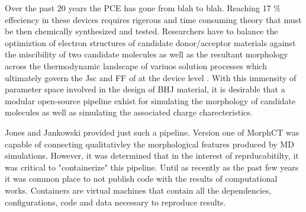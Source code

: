 Over the past 20 years the PCE has gone from blah to blah. Reaching 17 \% effeciency in these devices requires
rigerous and time consuming theory that must be then chemically synthesized and tested. Researchers have to
balance the optimiztion of electron structures of candidate donor/acceptor materials against the miscibility
of two candidate molecules as well as the resultant morphology across the thermodynamic landscape of
variuos solution processes which ultimately govern the Jsc and FF of at the device level \cite{Zhu2020a}. 
With this immensity of parameter space involved in the design of BHJ material, it is desirable that a modular
open-source pipeline exhist for simulating the morphology of candidate molecules as well as simulating the 
associated charge charecteristics. 

\indent Jones and Jankowski provided just such a pipeline. Version one of MorphCT was capable of
connecting qualitativley the morphological features produced by MD simulations. However, it was determined
that in the interest of reprducabitilty, it was critical to "containerize" this pipeline. Until as recently as
the past few years it was common place to not publish code with the results of computational works. Containers
are virtual machines that contain all the dependencies, configurations, code and data necessary to reproduce
results. \cite{Cito2016a}
